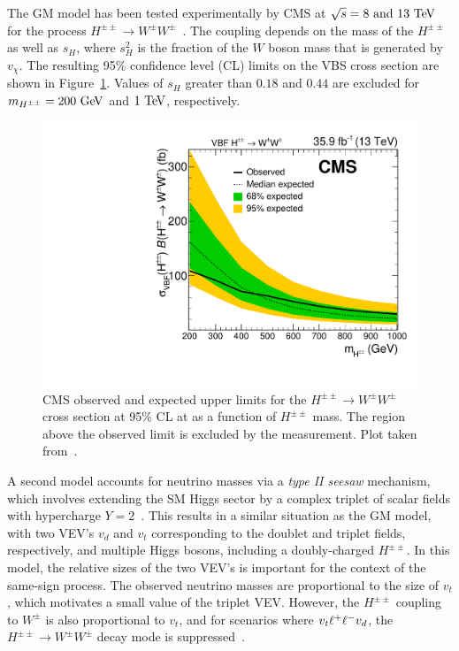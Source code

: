 The GM model has been tested experimentally by CMS at $\sqrt{s} = 8\textrm{\ and\ }13\tev$ for the process $H^{\pm\pm}\rightarrow W^{\pm}W^{\pm}$~\cite{2015.ssww-8tev-cms, 2017.ssww-13tev-cms}.
The coupling depends on the mass of the $H^{\pm\pm}$ as well as $s_H$, where $s_H^2$ is the fraction of the $W$ boson mass that is generated by $v_\chi$.
The resulting 95\% confidence level (CL) limits on the VBS cross section are shown in Figure~\ref{fig:cms-hpp-limits}.
Values of $s_H$ greater than $0.18$ and $0.44$ are excluded for $m_{H^{\pm\pm}} = 200\gev$ and $1\tev$, respectively.

\begin{figure}[htbp]
  \centering
  \includegraphics[width=.6\textwidth]{figs/ssww_13tev/extensions/cms-hpp}
  \caption[CMS observed and expected upper limits for the $H^{\pm\pm}\rightarrow W^{\pm}W^{\pm}$ cross section at 95\% CL at  as a function of $H^{\pm\pm}$ mass.  The region above the observed limit is excluded by the measurement.]{CMS observed and expected upper limits for the $H^{\pm\pm}\rightarrow W^{\pm}W^{\pm}$ cross section at 95\% CL at  as a function of $H^{\pm\pm}$ mass.  The region above the observed limit is excluded by the measurement. Plot taken from~\cite{2017.ssww-13tev-cms}.}
  \label{fig:cms-hpp-limits}
\end{figure}

A second model accounts for neutrino masses via a \emph{type II seesaw} mechanism, which involves extending the SM Higgs sector by a complex triplet of scalar fields with hypercharge $Y=2$~\cite{1980.neutrino-mass-higgs}.
This results in a similar situation as the GM model, with two VEV's $v_d$ and $v_t$ corresponding to the doublet and triplet fields, respectively, and multiple Higgs bosons, including a doubly-charged $H^{\pm\pm}$.
In this model, the relative sizes of the two VEV's is important for the context of the same-sign \sswwnojj process.
The observed neutrino masses are proportional to the size of $v_t$, which motivates a small value of the triplet VEV.
However, the $H^{\pm\pm}$ coupling to $W^\pm$ is also proportional to $v_t$, and for scenarios where $v_t \muchless v_d$, the $H^{\pm\pm}\rightarrow W^{\pm}W^{\pm}$ decay mode is suppressed~\cite{2008.type2-seesaw-lhc, 2011.higgs-type2-seesaw}.

